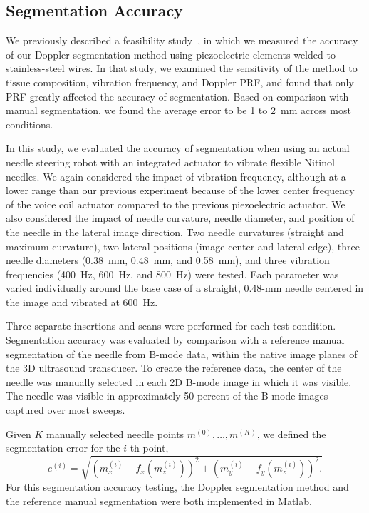 \subsection{Segmentation Accuracy}
We previously described a feasibility study~\cite{Adebar2013}, in which we measured the accuracy of our Doppler segmentation method using piezoelectric elements welded to stainless-steel wires. In that study, we examined the sensitivity of the method to tissue composition, vibration frequency, and Doppler PRF, and found that only PRF greatly affected the accuracy of segmentation. Based on comparison with manual segmentation, we found the average error to be 1 to 2~mm across most conditions.

In this study, we evaluated the accuracy of segmentation when using an actual needle steering robot with an integrated actuator to vibrate flexible Nitinol needles. We again considered the impact of vibration frequency, although at a lower range than our previous experiment because of the lower center frequency of the voice coil actuator compared to the previous piezoelectric actuator. We also considered the impact of needle curvature, needle diameter, and position of the needle in the lateral image direction. Two needle curvatures (straight and maximum curvature), two lateral positions (image center and lateral edge), three needle diameters (0.38~mm, 0.48~mm, and 0.58~mm), and three vibration frequencies (400~Hz, 600~Hz, and 800~Hz) were tested. Each parameter was varied individually around the base case of a straight, 0.48-mm needle centered in the image and vibrated at 600~Hz. 

Three separate insertions and scans were performed for each test condition. Segmentation accuracy was evaluated by comparison with a reference manual segmentation of the needle from B-mode data, within the native image planes of the 3D ultrasound transducer. To create the reference data, the center of the needle was manually selected in each 2D B-mode image in which it was visible. The needle was visible in approximately 50 percent of the B-mode images captured over most sweeps. 

Given $K$ manually selected needle points ${m}^{(0)}, \dotsc, {m}^{(K)}$, we defined the segmentation error for the $i$-th point,
\begin{equation}
e^{(i)} = \sqrt{ \left(m_x^{(i)}-f_x(m_z^{(i)})\right)^2 + \left(m_y^{(i)}-f_y(m_z^{(i)})\right)^2.} 
\end{equation}
\noindent For this segmentation accuracy testing, the Doppler segmentation method and the reference manual segmentation were both implemented in Matlab.

